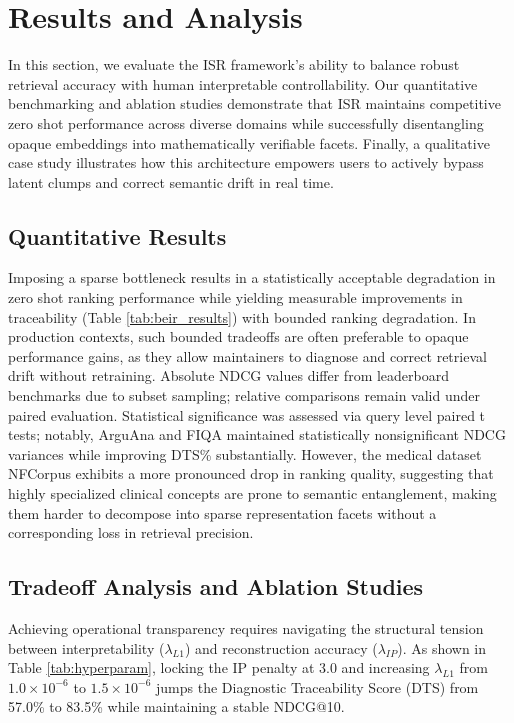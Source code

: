 \documentclass[sigconf,anonymous,screen]{acmart}
\begin{document}
\section{Results and Analysis}
In this section, we evaluate the ISR framework's ability to balance robust retrieval accuracy with human interpretable controllability. Our quantitative benchmarking and ablation studies demonstrate that ISR maintains competitive zero shot performance across diverse domains while successfully disentangling opaque embeddings into mathematically verifiable facets. Finally, a qualitative case study illustrates how this architecture empowers users to actively bypass latent clumps and correct semantic drift in real time.

\subsection{Quantitative Results}
\vspace{-2pt}
Imposing a sparse bottleneck results in a statistically acceptable degradation in zero shot ranking performance while yielding measurable improvements in traceability (Table \ref{tab:beir_results}) with bounded ranking degradation. In production contexts, such bounded tradeoffs are often preferable to opaque performance gains, as they allow maintainers to diagnose and correct retrieval drift without retraining. Absolute NDCG values differ from leaderboard benchmarks due to subset sampling; relative comparisons remain valid under paired evaluation. Statistical significance was assessed via query level paired t tests; notably, ArguAna and FIQA maintained statistically nonsignificant NDCG variances while improving DTS\% substantially. However, the medical dataset NFCorpus exhibits a more pronounced drop in ranking quality, suggesting that highly specialized clinical concepts are prone to semantic entanglement, making them harder to decompose into sparse representation facets without a corresponding loss in retrieval precision.


\subsection{Tradeoff Analysis and Ablation Studies}
\vspace{-2pt}
Achieving operational transparency requires navigating the structural tension between interpretability ($\lambda_{L1}$) and reconstruction accuracy ($\lambda_{IP}$). As shown in Table \ref{tab:hyperparam}, locking the IP penalty at 3.0 and increasing $\lambda_{L1}$ from $1.0\times 10^{-6}$ to $1.5\times 10^{-6}$ jumps the Diagnostic Traceability Score (DTS) from 57.0\% to 83.5\% while maintaining a stable NDCG@10. 
\end{document}
